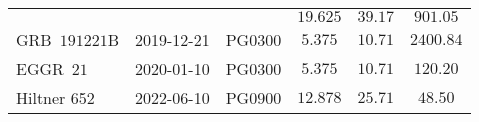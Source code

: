 \begin{table}[t]
\begin{tabular}{lccccc}
        &  &  & $19.625$ & $39.17$ & $901.05$ \\ %
        GRB~$191221$B & 2019-12-21 & PG$0300$ & $5.375$ & $10.71$ & $2400.84$ \\ %
        EGGR~$21$ & 2020-01-10 & PG$0300$ & $5.375$ & $10.71$ & $120.20$ \\ %
        Hiltner 652 & 2022-06-10 & PG$0900$ & $12.878$ & $25.71$ & $48.50$ \\
        \bottomrule
    \end{tabular}

\end{table}
